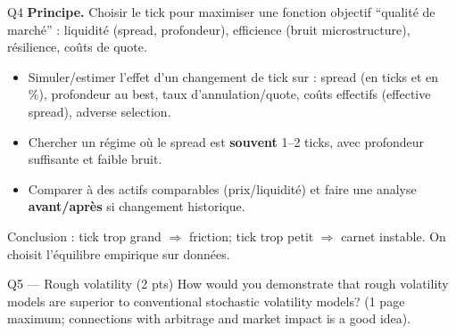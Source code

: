 \begin{solutionbox}{Q4}
\textbf{Principe.} Choisir le tick pour maximiser une fonction objectif ``qualité de marché'' : liquidité (spread, profondeur), efficience (bruit microstructure), résilience, coûts de quote.
\begin{itemize}[leftmargin=*]
  \item Simuler/estimer l'effet d'un changement de tick sur : spread (en ticks et en \%), profondeur au best, taux d'annulation/quote, coûts effectifs (effective spread), adverse selection.
  \item Chercher un régime où le spread est \textbf{souvent} 1--2 ticks, avec profondeur suffisante et faible bruit.
  \item Comparer à des actifs comparables (prix/liquidité) et faire une analyse \textbf{avant/après} si changement historique.
\end{itemize}
Conclusion : tick trop grand $\Rightarrow$ friction; tick trop petit $\Rightarrow$ carnet instable. On choisit l'équilibre empirique sur données.
\end{solutionbox}

\begin{questionbox}{Q5 --- Rough volatility (2 pts)}
How would you demonstrate that rough volatility models are superior to conventional stochastic volatility models? (1 page maximum; connections with arbitrage and market impact is a good idea).
\end{questionbox}

